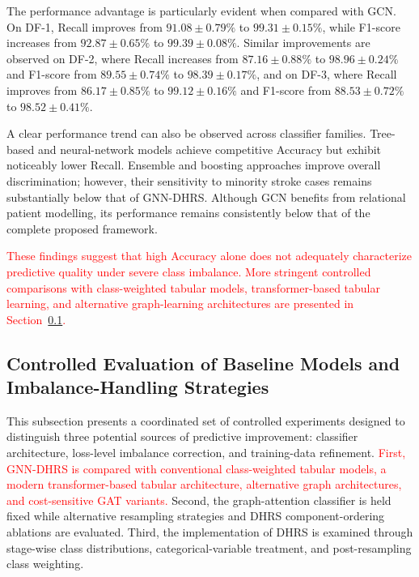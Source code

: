 \documentclass[pdflatex,sn-mathphys-num]{sn-jnl}%
\theoremstyle{thmstyleone}%
\theoremstyle{thmstyletwo}%
\theoremstyle{thmstylethree}%
\begin{document}
The performance advantage is particularly evident when compared with GCN.
On DF-1, Recall improves from \(91.08\pm0.79\%\) to
\(99.31\pm0.15\%\), while F1-score increases from
\(92.87\pm0.65\%\) to \(99.39\pm0.08\%\). Similar improvements are observed
on DF-2, where Recall increases from \(87.16\pm0.88\%\) to
\(98.96\pm0.24\%\) and F1-score from \(89.55\pm0.74\%\) to
\(98.39\pm0.17\%\), and on DF-3, where Recall improves from
\(86.17\pm0.85\%\) to \(99.12\pm0.16\%\) and F1-score from
\(88.53\pm0.72\%\) to \(98.52\pm0.41\%\).

A clear performance trend can also be observed across classifier families.
Tree-based and neural-network models achieve competitive Accuracy but exhibit
noticeably lower Recall. Ensemble and boosting approaches improve overall
discrimination; however, their sensitivity to minority stroke cases remains
substantially below that of GNN-DHRS. Although GCN benefits from relational
patient modelling, its performance remains consistently below that of the
complete proposed framework.

\textcolor{red}{
These findings suggest that high Accuracy alone does not adequately
characterize predictive quality under severe class imbalance. More stringent
controlled comparisons with class-weighted tabular models,
transformer-based tabular learning, and alternative graph-learning
architectures are presented in
Section~\ref{subsec:advanced_baseline_comparison}.
}

\subsection{
Controlled Evaluation of Baseline Models and Imbalance-Handling Strategies}
\label{subsec:advanced_baseline_comparison}
\label{subsec:controlled_imbalance_analysis}

 {
This subsection presents a coordinated set of controlled experiments designed
to distinguish three potential sources of predictive improvement: classifier
architecture, loss-level imbalance correction, and training-data refinement.
\textcolor{red}{
First, GNN-DHRS is compared with conventional class-weighted tabular models,
a modern transformer-based tabular architecture, alternative graph
architectures, and cost-sensitive GAT variants.
} Second, the
graph-attention classifier is held fixed while alternative resampling
strategies and DHRS component-ordering ablations are evaluated. Third, the
implementation of DHRS is examined through stage-wise class distributions,
categorical-variable treatment, and post-resampling class weighting.
}
\end{document}
